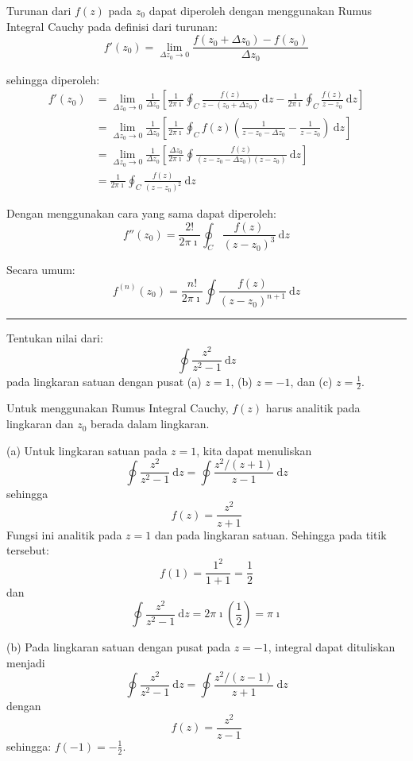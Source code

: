 Turunan dari $f(z)$ pada $z_{0}$ dapat diperoleh dengan menggunakan
Rumus Integral Cauchy pada definisi dari turunan:
\[
f'(z_{0})=\lim_{\Delta z_{0}\rightarrow0}\frac{f(z_{0}+\Delta z_{0})-f(z_{0})}{\Delta z_{0}}
\]

sehingga diperoleh:
\begin{align*}
f'(z_{0}) & =\lim_{\Delta z_{0}\rightarrow0}\frac{1}{\Delta z_{0}}\left[\frac{1}{2\pi\imath}\oint_{C}\frac{f(z)}{z-(z_{0}+\Delta z_{0})}\ \mathrm{d}z-\frac{1}{2\pi\imath}\oint_{C}\frac{f(z)}{z-z_{0}}\ \mathrm{d}z\right]\\
 & =\lim_{\Delta z_{0}\rightarrow0}\frac{1}{\Delta z_{0}}\left[\frac{1}{2\pi\imath}\oint_{C}f(z)\left(\frac{1}{z-z_{0}-\Delta z_{0}}-\frac{1}{z-z_{0}}\right)\ \mathrm{d}z\right]\\
 & =\lim_{\Delta z_{0}\rightarrow0}\frac{1}{\Delta z_{0}}\left[\frac{\Delta z_{0}}{2\pi\imath}\oint\frac{f(z)}{(z-z_{0}-\Delta z_{0})(z-z_{0})}\ \mathrm{d}z\right]\\
 & =\frac{1}{2\pi\imath}\oint_{C}\frac{f(z)}{(z-z_{0})^{2}}\ \mathrm{d}z
\end{align*}

Dengan menggunakan cara yang sama dapat diperoleh:
\[
f''(z_{0})=\frac{2!}{2\pi\imath}\oint_{C}\frac{f(z)}{(z-z_{0})^{3}}\ \mathrm{d}z
\]

Secara umum:
\[
f^{(n)}(z_{0})=\frac{n!}{2\pi\imath}\oint\frac{f(z)}{(z-z_{0})^{n+1}}\ \mathrm{d}z
\]

\rule[0.5ex]{1\columnwidth}{1pt}

Tentukan nilai dari:
\[
\oint\frac{z^{2}}{z^{2}-1}\ \mathrm{d}z
\]
pada lingkaran satuan dengan pusat (a) $z=1$, (b) $z=-1$, dan (c)
$z=\frac{1}{2}$.

Untuk menggunakan Rumus Integral Cauchy, $f(z)$ harus analitik pada
lingkaran dan $z_{0}$ berada dalam lingkaran.

(a) Untuk lingkaran satuan pada $z=1$, kita dapat menuliskan
\[
\oint\frac{z^{2}}{z^{2}-1}\ \mathrm{d}z=\oint\frac{z^{2}/(z+1)}{z-1}\ \mathrm{d}z
\]
sehingga
\[
f(z)=\frac{z^{2}}{z+1}
\]
Fungsi ini analitik pada $z=1$ dan pada lingkaran satuan. Sehingga
pada titik tersebut:
\[
f(1)=\frac{1^{2}}{1+1}=\frac{1}{2}
\]
dan
\[
\oint\frac{z^{2}}{z^{2}-1}\ \mathrm{d}z=2\pi\imath\left(\frac{1}{2}\right)=\pi\imath
\]

(b) Pada lingkaran satuan dengan pusat pada $z=-1$, integral dapat
dituliskan menjadi
\[
\oint\frac{z^{2}}{z^{2}-1}\ \mathrm{d}z=\oint\frac{z^{2}/(z-1)}{z+1}\ \mathrm{d}z
\]
dengan
\[
f(z)=\frac{z^{2}}{z-1}
\]
sehingga: $f(-1)=-\frac{1}{2}$.

